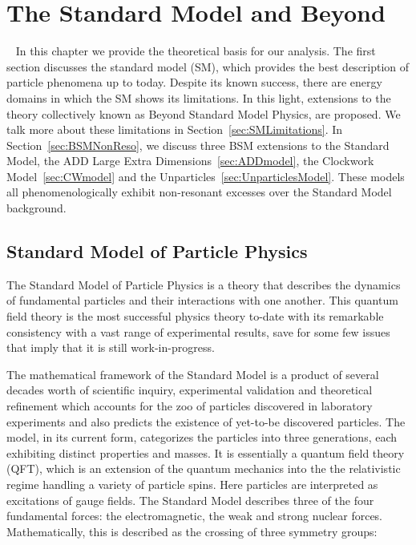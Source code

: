 \chapter{The Standard Model and Beyond}~\label{ch:theory}
In this chapter we provide the theoretical basis for our analysis. The first section discusses the standard model (SM), which provides the best description of particle phenomena up to today. Despite its known success, there are energy domains in which the SM shows its limitations. In this light, extensions to the theory collectively known as Beyond Standard Model Physics, are proposed. We talk more about these limitations in Section~\ref{sec:SMLimitations}. In Section~\ref{sec:BSMNonReso}, we discuss three BSM extensions to the Standard Model, the ADD Large Extra Dimensions~\ref{sec:ADDmodel}, the Clockwork Model~\ref{sec:CWmodel} and the Unparticles~\ref{sec:UnparticlesModel}. These models all phenomenologically exhibit non-resonant excesses over the Standard Model background. 

\section{Standard Model of Particle Physics}
The Standard Model of Particle Physics is a theory that describes the dynamics of fundamental particles and their interactions with one another. This quantum field theory is the most successful physics theory to-date with its remarkable consistency with a vast range of experimental results, save for some few issues that imply that it is still work-in-progress.

The mathematical framework of the Standard Model is a product of several decades worth of scientific inquiry, experimental validation and theoretical refinement which accounts for the zoo of particles discovered in laboratory experiments and also predicts the existence of yet-to-be discovered particles. The model, in its current form, categorizes the particles into three generations, each exhibiting distinct properties and masses. It is essentially a quantum field theory (QFT), which is an extension of the quantum mechanics into the the relativistic regime handling a variety of particle spins. Here particles are interpreted as excitations of gauge fields. The Standard Model describes three of the four fundamental forces: the electromagnetic, the weak and strong nuclear forces. Mathematically, this is described as the crossing of three symmetry groups:

